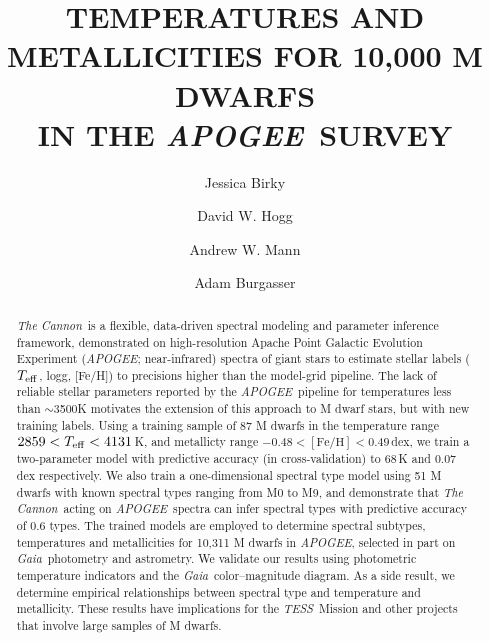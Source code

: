 \documentclass[modern]{aastex62}
\newcommand{\apogee}{\textsl{APOGEE}}
\newcommand{\thecannon}{\textsl{The Cannon}}
\newcommand{\gaia}{\textsl{Gaia}}
\newcommand{\tess}{\textsl{TESS}}
\newcommand{\teff}{$T_{\rm eff}$}
\begin{document}
\title{TEMPERATURES AND METALLICITIES FOR 10,000 M DWARFS\\ IN THE \apogee\ SURVEY}


\author[0000-0002-7961-6881]{Jessica Birky}

\author[0000-0003-2866-9403]{David W. Hogg}

\author[0000-0003-3654-1602]{Andrew W. Mann}

\author[0000-0002-6523-9536]{Adam Burgasser}

\begin{abstract}
\thecannon\ is a flexible, data-driven spectral modeling and parameter inference framework, demonstrated on high-resolution Apache Point Galactic Evolution Experiment (\apogee; near-infrared) spectra of giant stars to estimate stellar labels (\teff, logg, [Fe/H]) to precisions higher than the model-grid pipeline.
The lack of reliable stellar parameters reported by the \apogee\ pipeline for temperatures less than $\sim$3500K motivates the extension of this approach to M dwarf stars, but with new training labels.
Using a training sample of 87 M dwarfs in the temperature range $2859 < T_{\rm eff} < 4131$\,K, and metallicty range $-0.48 < \mathrm{[Fe/H]}< 0.49$\,dex, we train a two-parameter model with predictive accuracy (in cross-validation) to 68\,K and 0.07\,dex respectively.
We also train a one-dimensional spectral type model using 51 M dwarfs with known spectral types ranging from M0 to M9, and demonstrate that \thecannon\ acting on \apogee\ spectra can infer spectral types with predictive accuracy of 0.6 types.
The trained models are employed to determine spectral subtypes, temperatures and metallicities for 10,311 M dwarfs in \apogee, selected in part on \gaia\ photometry and astrometry.
We validate our results using photometric temperature indicators and the \gaia\ color--magnitude diagram.
As a side result, we determine empirical relationships between spectral type and temperature and metallicity.
These results have implications for the \tess\ Mission and other projects that involve large samples of M dwarfs.
\end{abstract}
\end{document}
